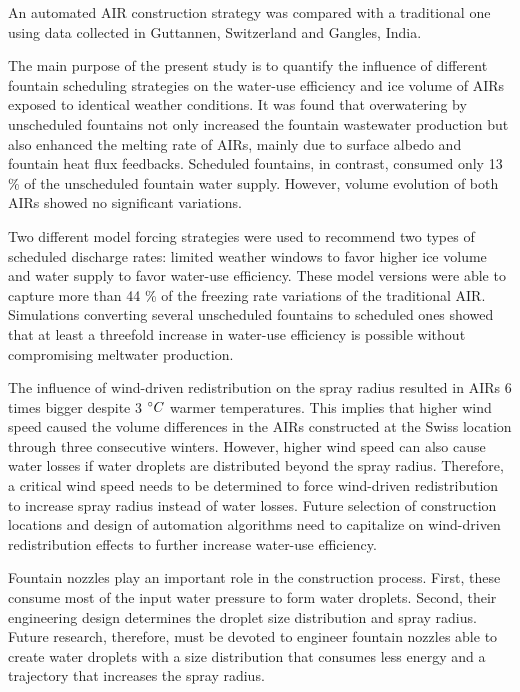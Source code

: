 \documentclass[tc, manuscript]{copernicus}
\begin{document}
\conclusions

An automated AIR construction strategy was compared with a traditional one using data collected in Guttannen,
Switzerland and Gangles, India.

The main purpose of the present study is to quantify the influence of different fountain scheduling strategies
on the water-use efficiency and ice volume of AIRs exposed to identical weather conditions. It was found that
overwatering by unscheduled fountains not only increased the fountain wastewater production but also enhanced
the melting rate of AIRs, mainly due to surface albedo and fountain heat flux feedbacks. Scheduled fountains, in
contrast, consumed only 13 \% of the unscheduled fountain water supply. However, volume evolution of both AIRs
showed no significant variations. 

Two different model forcing strategies were used to recommend two types of scheduled discharge rates: limited
weather windows to favor higher ice volume and water supply to favor water-use efficiency. These model versions
were able to capture more than 44 \% of the freezing rate variations of the traditional AIR. Simulations
converting several unscheduled fountains to scheduled ones showed that at least a threefold increase in
water-use efficiency is possible without compromising meltwater production.

The influence of wind-driven redistribution on the spray radius resulted in AIRs 6 times bigger despite 3
$^{\circ} C$ warmer temperatures. This implies that higher wind speed caused the volume differences in the AIRs
constructed at the Swiss location through three consecutive winters.  However, higher wind speed can also cause
water losses if water droplets are distributed beyond the spray radius. Therefore, a critical wind speed needs
to be determined to force wind-driven redistribution to increase spray radius instead of water losses. Future
selection of construction locations and design of automation algorithms need to capitalize on wind-driven
redistribution effects to further increase water-use efficiency.

Fountain nozzles play an important role in the construction process. First, these consume most of the input
water pressure to form water droplets. Second, their engineering design determines the droplet size distribution
and spray radius. Future research, therefore, must be devoted to engineer fountain nozzles able to create water
droplets with a size distribution that consumes less energy and a trajectory that increases the spray radius.
\end{document}
